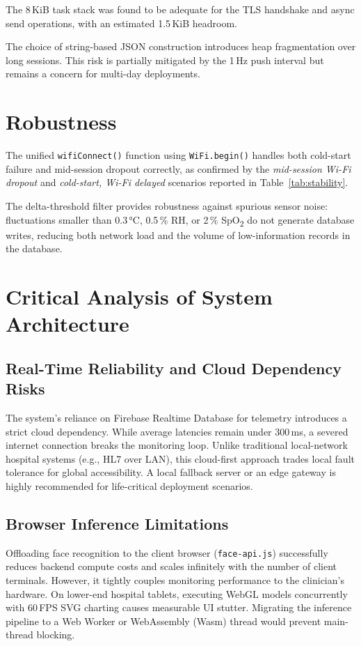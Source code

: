 The 8\,KiB task stack was found to be adequate for the TLS handshake and async send
operations, with an estimated 1.5\,KiB headroom.

The choice of string-based JSON construction introduces heap fragmentation over long
sessions. This risk is partially mitigated by the 1\,Hz push interval but remains a
concern for multi-day deployments.

\section{Robustness}

The unified \texttt{wifiConnect()} function using \texttt{WiFi.begin()} handles both
cold-start failure and mid-session dropout correctly, as confirmed by the
\textit{mid-session Wi-Fi dropout} and \textit{cold-start, Wi-Fi delayed} scenarios
reported in Table~\ref{tab:stability}.

The delta-threshold filter provides robustness against spurious sensor noise:
fluctuations smaller than 0.3\,°C, 0.5\,\% RH, or 2\,\% SpO\textsubscript{2} do
not generate database writes, reducing both network load and the volume of
low-information records in the database.

\section{Critical Analysis of System Architecture}
\subsection{Real-Time Reliability and Cloud Dependency Risks}
The system's reliance on Firebase Realtime Database for telemetry introduces a strict cloud dependency. While average latencies remain under 300\,ms, a severed internet connection breaks the monitoring loop. Unlike traditional local-network hospital systems (e.g., HL7 over LAN), this cloud-first approach trades local fault tolerance for global accessibility. A local fallback server or an edge gateway is highly recommended for life-critical deployment scenarios.

\subsection{Browser Inference Limitations}
Offloading face recognition to the client browser (\texttt{face-api.js}) successfully reduces backend compute costs and scales infinitely with the number of client terminals. However, it tightly couples monitoring performance to the clinician's hardware. On lower-end hospital tablets, executing WebGL models concurrently with 60\,FPS SVG charting causes measurable UI stutter. Migrating the inference pipeline to a Web Worker or WebAssembly (Wasm) thread would prevent main-thread blocking.

